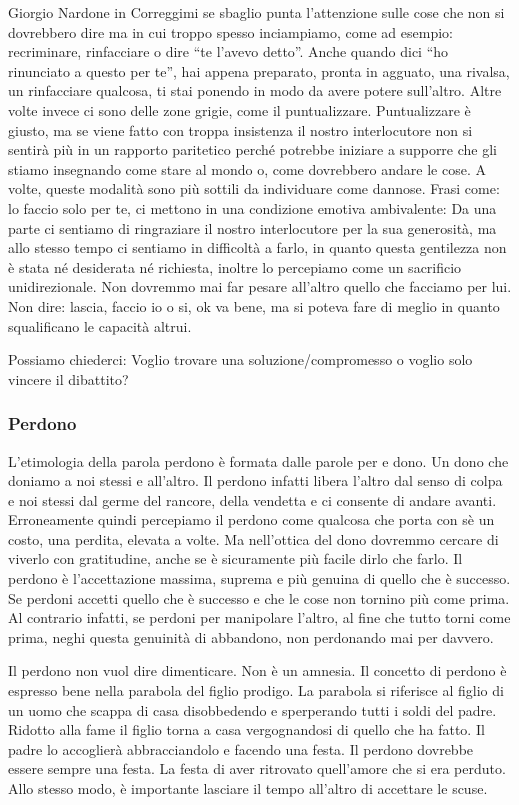 \documentclass[12pt]{book} %
\begin{document}
Giorgio Nardone in Correggimi se sbaglio punta
l'attenzione sulle cose che non si dovrebbero dire ma in cui troppo spesso inciampiamo, come ad
esempio: recriminare, rinfacciare o dire “te l'avevo detto”. Anche quando dici “ho rinunciato a questo per te”, hai
appena preparato, pronta in agguato, una rivalsa, un rinfacciare qualcosa, ti stai ponendo in modo da avere potere
sull'altro. Altre volte invece ci sono delle zone grigie, come il puntualizzare. Puntualizzare è giusto, ma se viene
fatto con troppa insistenza il nostro interlocutore non si sentirà più in un rapporto paritetico perché potrebbe
iniziare a supporre che gli stiamo insegnando come stare al mondo o, come dovrebbero andare le cose. A volte, queste
modalità sono più sottili da individuare come dannose. Frasi come: lo faccio solo per te, ci mettono in una condizione
emotiva ambivalente: Da una parte ci sentiamo di ringraziare il nostro interlocutore per la sua generosità, ma allo
stesso tempo ci sentiamo in difficoltà a farlo, in quanto questa gentilezza non è stata né desiderata né
richiesta, inoltre lo percepiamo come un sacrificio unidirezionale. Non dovremmo mai far pesare
all'altro quello che facciamo per lui. Non dire: lascia, faccio io o si, ok va bene, ma si poteva
fare di meglio in quanto squalificano le capacità altrui.

Possiamo chiederci: Voglio trovare una soluzione/compromesso o voglio solo vincere il dibattito? 

\subsubsection{Perdono}
L'etimologia della parola perdono è formata dalle parole per e dono. Un dono che doniamo a noi
stessi e all'altro. Il perdono infatti libera l'altro dal senso di colpa e
noi stessi dal germe del rancore, della vendetta e ci consente di andare avanti. Erroneamente quindi percepiamo il
perdono come qualcosa che porta con sè un costo, una perdita, elevata a volte. Ma nell'ottica del
dono dovremmo cercare di viverlo con gratitudine, anche se è sicuramente più facile dirlo che farlo. Il perdono è
l'accettazione massima, suprema e più genuina di quello che è successo. Se perdoni accetti quello
che è successo e che le cose non tornino più come prima. Al contrario infatti, se perdoni per manipolare l'altro, al
fine che tutto torni come prima, neghi questa genuinità di abbandono, non perdonando mai per davvero.

Il perdono non vuol dire dimenticare. Non è un amnesia. Il concetto di perdono è espresso bene nella parabola del figlio
prodigo. La parabola si riferisce al figlio di un uomo che scappa di casa
disobbedendo e sperperando tutti i soldi del padre. Ridotto alla fame il figlio torna a casa vergognandosi di quello
che ha fatto. Il padre lo accoglierà abbracciandolo e facendo una festa. Il perdono dovrebbe essere sempre una festa.
La festa di aver ritrovato quell'amore che si era perduto. Allo stesso modo, è importante lasciare il tempo
all'altro di accettare le scuse.
\end{document}
